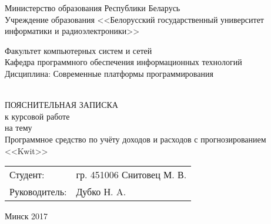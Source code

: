 \begin{titlepage}
  \begin{center}
    Министерство образования Республики Беларусь\\[0.4em]
    Учреждение образования <<Белорусский государственный университет информатики
    и радиоэлектроники>>\\[3.5em]

    \begin{minipage}{\textwidth}
      \begin{center}
          Факультет компьютерных систем и сетей\\[1em]
          Кафедра программного обеспечения информационных технологий\\[1em]
          Дисциплина: Современные платформы программирования
      \end{center}
    \end{minipage}\\[3em]
    ПОЯСНИТЕЛЬНАЯ ЗАПИСКА\\
    к курсовой работе\\
    на тему\\[1em]
    Программное средство по учёту доходов и расходов с прогнозированием \\ <<Kwit>>\\[1em]
    \vspace{8em}

    \begin{flushright}
        \begin{minipage}{10cm}
        	\begin{tabular}{p{3cm} p{6.1cm}} 
        	Студент: & гр. 451006 Снитовец М. В. \\[1.4em]
            Руководитель: & Дубко Н. A.
            \end{tabular}
        \end{minipage}
    \end{flushright}

    \vfill
    {\normalsize Минск 2017}
  \end{center}
\end{titlepage}
